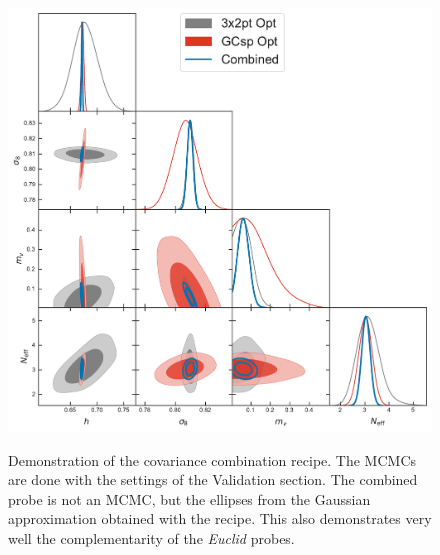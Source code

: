 \documentclass[oneside]{book}
\newcommand*{\Euclid}{\textit{Euclid}\xspace}
\begin{document}
\begin{figure}
    \centering
    \includegraphics[width=\linewidth]{combined_probes_mnu+Neff_cosmo_test_smoothing.pdf}
    \label{fig:combining-probes}
    \caption{Demonstration of the covariance combination recipe. The MCMCs are done with the settings of the Validation section. The combined probe is not an MCMC, but the ellipses from the Gaussian approximation obtained with the recipe. This also demonstrates very well the complementarity of the \Euclid probes.}
\end{figure}
\end{document}

